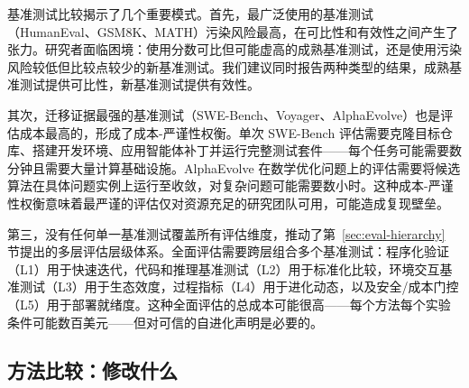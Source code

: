 基准测试比较揭示了几个重要模式。首先，最广泛使用的基准测试（HumanEval、GSM8K、MATH）污染风险最高，在可比性和有效性之间产生了张力。研究者面临困境：使用分数可比但可能虚高的成熟基准测试，还是使用污染风险较低但比较点较少的新基准测试。我们建议同时报告两种类型的结果，成熟基准测试提供可比性，新基准测试提供有效性。

其次，迁移证据最强的基准测试（SWE-Bench、Voyager、AlphaEvolve）也是评估成本最高的，形成了成本-严谨性权衡。单次 SWE-Bench 评估需要克隆目标仓库、搭建开发环境、应用智能体补丁并运行完整测试套件——每个任务可能需要数分钟且需要大量计算基础设施。AlphaEvolve 在数学优化问题上的评估需要将候选算法在具体问题实例上运行至收敛，对复杂问题可能需要数小时。这种成本-严谨性权衡意味着最严谨的评估仅对资源充足的研究团队可用，可能造成复现壁垒。

第三，没有任何单一基准测试覆盖所有评估维度，推动了第~\ref{sec:eval-hierarchy} 节提出的多层评估层级体系。全面评估需要跨层组合多个基准测试：程序化验证（L1）用于快速迭代，代码和推理基准测试（L2）用于标准化比较，环境交互基准测试（L3）用于生态效度，过程指标（L4）用于进化动态，以及安全/成本门控（L5）用于部署就绪度。这种全面评估的总成本可能很高——每个方法每个实验条件可能数百美元——但对可信的自进化声明是必要的。


\subsection{方法比较：修改什么}
\label{sec:eval-method-compare}

